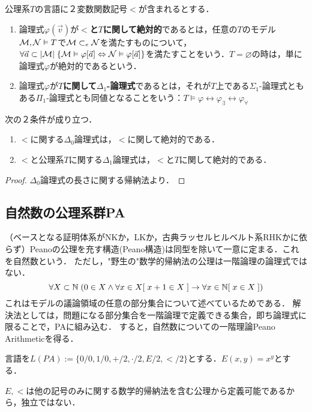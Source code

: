\documentclass[uplatex, 12pt, dvipdfmx]{jsreport}
\begin{document}
\begin{definition}
    公理系$T$の言語に２変数関数記号$<$が含まれるとする．
    \begin{enumerate}
        \item 論理式$\varphi(\vec{v})$が\textbf{$<$と$T$に関して絶対的}であるとは，任意の$T$のモデル$\mathcal{M},\mathcal{N}\vDash T$で$\mathcal{M}\subset_e\mathcal{N}$を満たすものについて，$\forall\vec{a}\subset|\mathcal{M}|\;\{\mathcal{M}\vDash\varphi[\vec{a}]\Leftrightarrow\mathcal{N}\vDash\varphi[\vec{a}]\}$を満たすことをいう．$T=\varnothing$の時は，単に論理式$\varphi$が絶対的であるという．
        \item 論理式$\varphi$が\textbf{$T$に関して$\Delta_1$-論理式}であるとは，それが$T$上である$\Sigma_1$-論理式ともある$\Pi_1$-論理式とも同値となることをいう：$T\vDash\varphi\leftrightarrow\varphi_\exists\leftrightarrow\varphi_\forall$
    \end{enumerate}
\end{definition}

\begin{lemma}
    次の２条件が成り立つ．
    \begin{enumerate}
        \item $<$に関する$\Delta_0$論理式は，$<$に関して絶対的である．
        \item $<$と公理系$T$に関する$\Delta_1$論理式は，$<$と$T$に関して絶対的である．
    \end{enumerate}
\end{lemma}
\begin{proof}
    $\Delta_0$論理式の長さに関する帰納法より．
\end{proof}

\subsection{自然数の公理系群PA}

（ベースとなる証明体系がNKか，LKか，古典ラッセルヒルベルト系RHKかに依らず）Peanoの公理を充す構造(Peano構造)は同型を除いて一意に定まる．これを自然数という．
ただし，"野生の"数学的帰納法の公理は一階論理の論理式ではない．
\[ \forall X\subset\mathbb{N}\;(0\in X\land\forall x\in X[\;x+1\in X\;]\to\forall x\in\mathbb{N}[\;x\in X\;]) \]
これはモデルの議論領域の任意の部分集合について述べているためである．
解決法としては，問題になる部分集合を一階論理で定義できる集合，即ち論理式に限ることで，PAに組み込む．
すると，自然数についての一階理論Peano Arithmeticを得る．

\begin{definition}[PAの言語]
    言語を$L(PA):=\{0/0,1/0,+/2,\cdot/2,E/2,</2\}$とする．$E(x,y)=x^y$とする．
\end{definition}
\begin{remark}
    $E,<$は他の記号のみに関する数学的帰納法を含む公理から定義可能であるから，独立ではない．
\end{remark}
\end{document}
